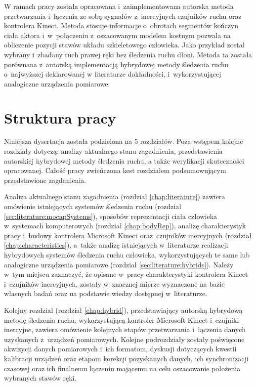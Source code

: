 W ramach pracy została opracowana i~zaimplementowana autorska metoda przetwarzania i~łączenia ze sobą sygnałów z~inercyjnych czujników ruchu oraz kontrolera Kinect. Metoda stosuje informacje o~obrotach segmentów kończyn ciała aktora i~w~połączeniu z~oszacowanym modelem kostnym pozwala na obliczenie pozycji stawów układu szkieletowego człowieka. 
Jako przykład został wybrany i~zbadany ruch prawej ręki bez śledzenia ruchu dłoni. Metoda ta została porównana z~autorską implementacją hybrydowej metody śledzenia ruchu o~najwyższej deklarowanej w literaturze dokładności, i~wykorzystującej analogiczne urządzenia pomiarowe.\\

\section{Struktura pracy}
Niniejsza dysertacja została podzielona na 5 rozdziałów. Poza wstępem kolejne rozdziały dotyczą: analizy aktualnego stanu zagadnienia, przedstawienia autorskiej hybrydowej metody śledzenia ruchu, a także weryfikacji skuteczności opracowanej. Całość pracy zwieńczona kest rozdziałem podsumowującym przedstawione zagdanienia. 

Analiza aktualnego stanu zagadnienia (rozdział \ref{chap:literature}) zawiera omówienie istniejących systemów śledzenia ruchu (rozdział \ref{sec:literature:mocapSystems}), sposobów reprezentacji ciała człowieka w~systemach komputerowych (rozdział \ref{chap:bodyRep}), analizę charakterystyk pracy i~budowy kontrolera Microsoft Kinect oraz~czujników inercyjnych (rozdział \ref{chap:characteristics}), a~także analizę istniejących w~literaturze realizacji hybrydowych systemów śledzenia ruchu człowieka, wykorzystujących te same lub analogiczne urządzenia pomiarowe (rozdział \ref{sec:literature:hybrids}). Należy w~tym miejscu zaznaczyć, że opisane w~pracy charakterystyki kontrolera Kinect i~czujników inercyjnych, zostały w~znacznej mierze wyznaczone na bazie własnych badań oraz na podstawie wiedzy dostępnej w~literaturze.

Kolejny rozdział (rozdział \ref{chap:hybrid}), przedstawiający autorską hybrydową metodę śledzenia ruchu, wykorzystującą kontroler Microsoft Kinect i~czujniki inercyjne, zawiera omówienie kolejnych etapów przetwarzania i~łączenia danych uzyskanych z~urządzeń pomiarowych. Kolejne podrozdziały zostały poświęcone akwizycji danych pomiarowych i~ich formatom, dyskusji dotyczących kwestii kalibracji urządzeń oraz etapom korekcji pozyskanych danych, ich synchronizacji czasowej oraz ich finalnemu łączeniu mającemu na celu oszacowanie położenia wybranych stawów ręki. 

